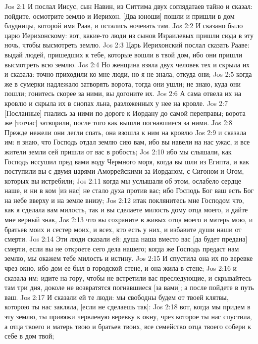 Jos 2:1  И послал Иисус, сын Навин, из Ситтима двух соглядатаев тайно и сказал: пойдите, осмотрите землю и Иерихон. [Два юноши] пошли и пришли в дом блудницы, которой имя Раав, и остались ночевать там.
Jos 2:2  И сказано было царю Иерихонскому: вот, какие-то люди из сынов Израилевых пришли сюда в эту ночь, чтобы высмотреть землю.
Jos 2:3  Царь Иерихонский послал сказать Рааве: выдай людей, пришедших к тебе, которые вошли в твой дом, ибо они пришли высмотреть всю землю.
Jos 2:4  Но женщина взяла двух человек тех и скрыла их и сказала: точно приходили ко мне люди, но я не знала, откуда они;
Jos 2:5  когда же в сумерки надлежало затворять ворота, тогда они ушли; не знаю, куда они пошли; гонитесь скорее за ними, вы догоните их.
Jos 2:6  А сама отвела их на кровлю и скрыла их в снопах льна, разложенных у нее на кровле.
Jos 2:7  [Посланные] гнались за ними по дороге к Иордану до самой переправы; ворота же [тотчас] затворили, после того как вышли погнавшиеся за ними.
Jos 2:8  Прежде нежели они легли спать, она взошла к ним на кровлю
Jos 2:9  и сказала им: я знаю, что Господь отдал землю сию вам, ибо вы навели на нас ужас, и все жители земли сей пришли от вас в робость;
Jos 2:10  ибо мы слышали, как Господь иссушил пред вами воду Чермного моря, когда вы шли из Египта, и как поступили вы с двумя царями Аморрейскими за Иорданом, с Сигоном и Огом, которых вы истребили;
Jos 2:11  когда мы услышали об этом, ослабело сердце наше, и ни в ком [из нас] не стало духа против вас; ибо Господь Бог ваш есть Бог на небе вверху и на земле внизу;
Jos 2:12  итак поклянитесь мне Господом что, как я сделала вам милость, так и вы сделаете милость дому отца моего, и дайте мне верный знак,
Jos 2:13  что вы сохраните в живых отца моего и матерь мою, и братьев моих и сестер моих, и всех, кто есть у них, и избавите души наши от смерти.
Jos 2:14  Эти люди сказали ей: душа наша вместо вас [да будет предана] смерти, если вы не откроете сего дела нашего; когда же Господь предаст нам землю, мы окажем тебе милость и истину.
Jos 2:15  И спустила она их по веревке чрез окно, ибо дом ее был в городской стене, и она жила в стене;
Jos 2:16  и сказала им: идите на гору, чтобы не встретили вас преследующие, и скрывайтесь там три дня, доколе не возвратятся погнавшиеся [за вами]; а после пойдете в путь ваш.
Jos 2:17  И сказали ей те люди: мы свободны будем от твоей клятвы, которою ты нас закляла, [если не сделаешь так]:
Jos 2:18  вот, когда мы придем в эту землю, ты привяжи червленую веревку к окну, чрез которое ты нас спустила, а отца твоего и матерь твою и братьев твоих, все семейство отца твоего собери к себе в дом твой;
